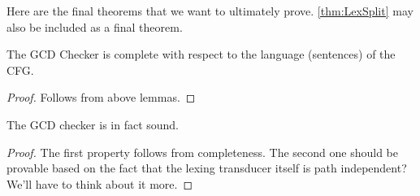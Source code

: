 Here are the final theorems that we want to ultimately prove. \ref{thm:LexSplit} may also be included as a final theorem.
\begin{theorem}
    \label{thm:GCDCheckerComplete}
    The GCD Checker is complete with respect to the language (sentences) of the CFG.
\end{theorem}
\begin{proof}
    Follows from above lemmas.
\end{proof}

\begin{theorem}
    \label{thm:GCDCheckerSound}
    The GCD checker is in fact sound.
\end{theorem}
\begin{proof}
    The first property follows from completeness. The second one should be provable based on the fact that the lexing transducer itself is path independent? We'll have to think about it more.
\end{proof}

